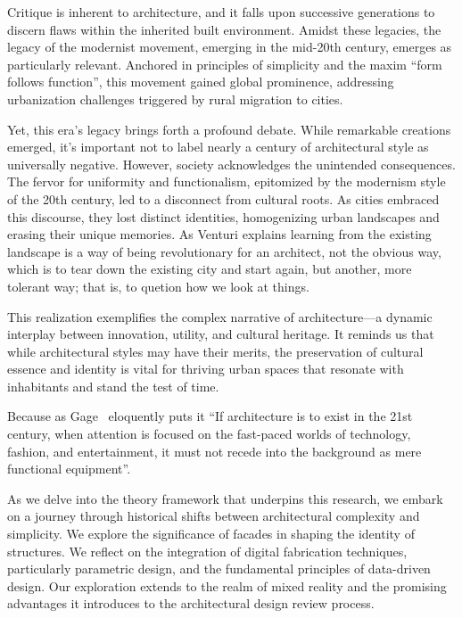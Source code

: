 Critique is inherent to architecture, and it falls upon successive generations to discern flaws within the inherited built environment.
Amidst these legacies, the legacy of the modernist movement, emerging in the mid-20th century, emerges as particularly relevant.
Anchored in principles of simplicity and the maxim ``form follows function'', this movement gained global prominence, addressing urbanization challenges triggered by rural migration to cities.

Yet, this era's legacy brings forth a profound debate.
While remarkable creations emerged, it's important not to label nearly a century of architectural style as universally negative.
However, society acknowledges the unintended consequences.
The fervor for uniformity and functionalism, epitomized by the modernism style of the 20th century, led to a disconnect from cultural roots.
As cities embraced this discourse, they lost distinct identities, homogenizing urban landscapes and erasing their unique memories.
As Venturi\cite{Venturi1972} explains learning from  the existing landscape  is  a  way of being revolutionary for  an  architect, not the obvious way, which is to tear down the existing city and start again, but another, more tolerant way;
that is, to quetion how we look at things.

This realization exemplifies the complex narrative of architecture—a dynamic interplay between innovation, utility, and cultural heritage.
It reminds us that while architectural styles may have their merits, the preservation of cultural essence and identity is vital for thriving urban spaces that resonate with inhabitants and stand the test of time.

 Because as Gage~\cite{Gage2015} eloquently puts it ``If architecture is to exist in the 21st century, when attention is focused on the fast-paced worlds of technology, fashion, and entertainment, it must not recede into the background as mere functional equipment''.

As we delve into the theory framework that underpins this research, we embark on a journey through historical shifts between architectural complexity and simplicity.
We explore the significance of facades in shaping the identity of structures.
We reflect on the integration of digital fabrication techniques, particularly parametric design, and the fundamental principles of data-driven design.
Our exploration extends to the realm of mixed reality and the promising advantages it introduces to the architectural design review process.

